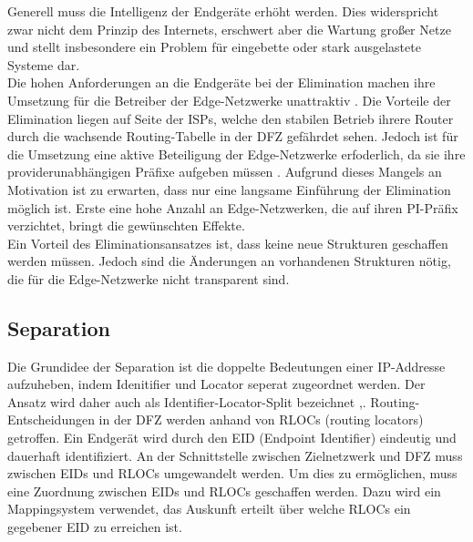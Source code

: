 Generell muss die Intelligenz der Endgeräte erhöht werden. Dies widerspricht zwar nicht dem Prinzip des Internets, erschwert aber die Wartung großer Netze und stellt insbesondere ein Problem für eingebette oder stark ausgelastete Systeme dar. \\

Die hohen Anforderungen an die Endgeräte bei der Elimination machen ihre Umsetzung für die Betreiber der Edge-Netzwerke unattraktiv \cite{jen:2008:start}. Die Vorteile der Elimination liegen auf Seite der ISPs, welche den stabilen Betrieb ihrere Router durch die wachsende Routing-Tabelle in der DFZ gefährdet sehen. Jedoch ist für die Umsetzung eine aktive Beteiligung der Edge-Netzwerke erfoderlich, da sie ihre providerunabhängigen Präfixe aufgeben müssen \cite{jen:2008:start}. Aufgrund dieses Mangels an Motivation ist zu erwarten, dass nur eine langsame Einführung der Elimination möglich ist. Erste eine hohe Anzahl an Edge-Netzwerken, die auf ihren PI-Präfix verzichtet, bringt die gewünschten Effekte. \\

Ein Vorteil des Eliminationsansatzes ist, dass keine neue Strukturen geschaffen werden müssen. Jedoch sind die Änderungen an vorhandenen Strukturen nötig, die für die Edge-Netzwerke nicht transparent sind.

\subsection{Separation}
Die Grundidee der Separation ist die doppelte Bedeutungen einer IP-Addresse aufzuheben, indem Idenitifier und Locator seperat zugeordnet werden. Der Ansatz wird daher auch als Identifier-Locator-Split bezeichnet \cite{deering:1996:map},\cite{jen:2008:start}. Routing-Entscheidungen in der DFZ werden anhand von RLOCs (routing locators) getroffen. Ein Endgerät wird durch den EID (Endpoint Identifier) eindeutig und dauerhaft identifiziert. An der Schnittstelle zwischen Zielnetzwerk und DFZ muss zwischen EIDs und RLOCs umgewandelt werden. Um dies zu ermöglichen, muss eine Zuordnung zwischen EIDs und RLOCs geschaffen werden. Dazu wird ein Mappingsystem verwendet, das Auskunft erteilt über welche RLOCs ein gegebener EID zu erreichen ist. \\

